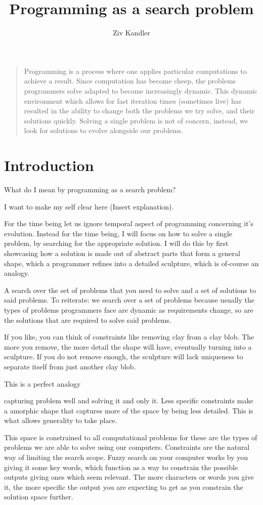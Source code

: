 \documentclass[a4paper]{article}
\title{\Huge{Programming as a search problem}}
\author{Ziv Kandler}
\begin{document}
\begin{quotation}
Programming is a process where one applies particular computations to achieve a result.
Since computation has become cheep, the problems programmers solve adapted to become 
increasingly dynamic. This dynamic environment which allows for fast iteration times 
(sometimes live) has resulted in the ability to change both the problems we try solve, 
and their solutions quickly. Solving a single problem is not of concern, instead, we 
look for solutions to evolve alongside our problems.
\end{quotation}


\section{Introduction}
What do I mean by programming as a search problem? 

I want to make my self clear here (Insert explanation).  

For the time being let us ignore temporal aspect of programming concerning it's evolution.
Instead for the time being, I will focus on how to solve a single problem, by searching for 
the appropriate solution. I will do this by first showcasing how a solution is made out 
of abstract parts that form a general shape, which a programmer refines into a detailed 
sculpture, which is of-course an analogy.



A search over the set of problems that you need to solve and a set of solutions to said problems. 
To reiterate: we search over a set of problems because usually the types of problems programmers 
face are dynamic as requirements change, so are the solutions that are required to solve said problems.

If you like, you can think of constraints like removing clay from a clay blob. The more 
you remove, the more detail the shape will have, eventually turning into a sculpture. If 
you do not remove enough, the sculpture will lack uniqueness to separate itself from just 
another clay blob.

This is a perfect analogy

capturing problem well and solving it and only it. Less specific 
constraints make a amorphic shape that captures more of the space by being less detailed.
This is what allows generality to take place.

This space is constrained to all computational problems for these are the types of problems we 
are able to solve using our computers. Constraints are the natural way of limiting the search 
scope. Fuzzy search on your computer works by you giving it some key words, which function as
a way to constrain the possible outputs giving ones which seem relevant. The more characters
or words you give it, the more specific the output you are expecting to get as you constrain
the solution space further.
\end{document}
